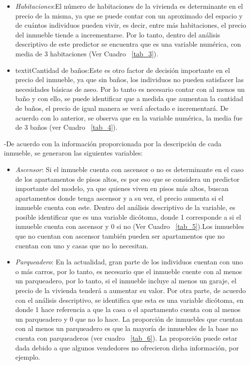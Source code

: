 \documentclass[conference, 10pt]{IEEEtran}
\begin{document}
\begin{itemize}
\item \textit{Habitaciones}:El número de habitaciones de la vivienda es determinante en el precio de la misma, ya que se puede contar con un aproximado del espacio y de cuántos individuos pueden vivir, es decir, entre más habitaciones, el precio del inmueble tiende a incrementarse. Por lo tanto, dentro del análisis descriptivo de este predictor se encuentra que es  una variable numérica, con media de 3 habitaciones (Ver Cuadro ~\ref{tab_3}).
\item textit{Cantidad de baños}:Este es otro factor de decisión importante en el precio del inmueble, ya que sin baños, los individuos no pueden satisfacer las necesidades básicas de aseo. Por lo tanto es necesario contar con al menos un baño y con ello, se puede identificar que a medida que aumentan la cantidad de baños, el precio de igual manera se verá afectado e incrementará. De acuerdo con lo anterior, se observa que en la variable numérica, la media fue de 3 baños (ver Cuadro ~\ref{tab_4}).
\end{itemize}

-De acuerdo con la información proporcionada por la descripción de cada inmueble, se generaron las siguientes variables:

\begin{itemize}
\item \textit{Ascensor}: Si el inmueble cuenta con ascensor o no es determinante en el caso de los apartamentos de pisos altos, es por eso que se considera un predictor importante del modelo, ya que quienes viven en pisos más altos, buscan apartamentos donde tenga ascensor y a su vez, el precio aumenta si el inmueble cuenta con este. Dentro del análisis descriptivo de la variable, es posible identificar que es una variable dicótoma, donde 1 corresponde a si el inmueble cuenta con ascensor y 0 si no (Ver Cuadro ~\ref{tab_5}).Los inmuebles que no cuentan con ascensor también pueden ser apartamentos que no cuentan con uno y casas que no lo necesitan.
\item \textit{Parqueadero}: En la actualidad, gran parte de los individuos cuentan con uno o más carros, por lo tanto, es necesario que el inmueble cuente con al menos un parqueadero, por lo tanto, si el inmueble incluye al menos un garaje, el precio de la vivienda tenderá a aumentar su valor. Por otra parte, de acuerdo con el análisis descriptivo, se identifica que esta es una variable dicótoma, en donde 1 hace referencia a que la casa o el apartamento cuenta con al menos un parqueadero y 0 que no lo hace. La proporción de inmuebles que cuentan con al menos un parqueadero es que la mayoría de inmuebles de la base no cuenta con parqueaderos (ver cuadro ~\ref{tab_6}). La proporción puede estar dada debido a que algunos vendedores no ofrecieron dicha información, por ejemplo.
\end{itemize}
 
\end{document}
